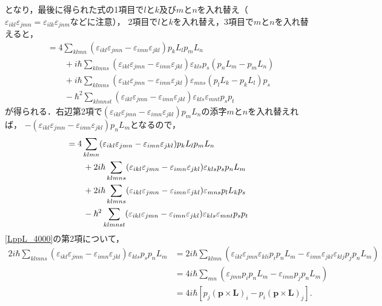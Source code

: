 となり，最後に得られた式の1項目で$l$と$k$及び$m$と$n$を入れ替え（$\varepsilon_{ikl}\varepsilon_{jmn}=\varepsilon_{ilk}\varepsilon_{jnm}$などに注意），
2項目で$l$と$k$を入れ替え，3項目で$m$と$n$を入れ替えると，
\begin{align*}
  [(\boldsymbol{L}\times\boldsymbol{p} - \boldsymbol{p}\times\boldsymbol{L})_i,(\boldsymbol{L}\times\boldsymbol{p} - \boldsymbol{p}\times\boldsymbol{L})_j]
  & = 4\sum_{klmn}(\varepsilon_{ikl}\varepsilon_{jmn} - \varepsilon_{imn}\varepsilon_{jkl})p_kL_lp_mL_n\\
  & \qquad  + i\hbar\sum_{klmns}(\varepsilon_{ikl}\varepsilon_{jmn} - \varepsilon_{imn}\varepsilon_{jkl})\varepsilon_{kls}p_s(p_nL_m - p_mL_n)\\
  & \qquad  + i\hbar\sum_{klmns}(\varepsilon_{ikl}\varepsilon_{jmn} - \varepsilon_{imn}\varepsilon_{jkl})\varepsilon_{mns}(p_lL_k - p_kL_l)p_s\\
  & \qquad - \hbar^2\sum_{klmnst}(\varepsilon_{ikl}\varepsilon_{jmn} - \varepsilon_{imn}\varepsilon_{jkl})\varepsilon_{kls}\varepsilon_{mnt}p_sp_t
\end{align*}
が得られる．右辺第2項で$(\varepsilon_{ikl}\varepsilon_{jmn} - \varepsilon_{imn}\varepsilon_{jkl})p_mL_n$の添字$m$と$n$を入れ替えれば，
$ - (\varepsilon_{ikl}\varepsilon_{jmn} - \varepsilon_{imn}\varepsilon_{jkl})p_nL_m$となるので，
\begin{align}
  [(\boldsymbol{L}\times\boldsymbol{p} - \boldsymbol{p}\times\boldsymbol{L})_i,(\boldsymbol{L}\times\boldsymbol{p} - \boldsymbol{p}\times\boldsymbol{L})_j]
  & = 4\sum_{klmn}(\varepsilon_{ikl}\varepsilon_{jmn} - \varepsilon_{imn}\varepsilon_{jkl})p_kL_lp_mL_n\notag\\
  & \qquad  + 2i\hbar\sum_{klmns}(\varepsilon_{ikl}\varepsilon_{jmn} - \varepsilon_{imn}\varepsilon_{jkl})\varepsilon_{kls}p_sp_nL_m\notag\\
  & \qquad  + 2i\hbar\sum_{klmns}(\varepsilon_{ikl}\varepsilon_{jmn} - \varepsilon_{imn}\varepsilon_{jkl})\varepsilon_{mns}p_lL_kp_s\notag\\
  & \qquad - \hbar^2\sum_{klmnst}(\varepsilon_{ikl}\varepsilon_{jmn} - \varepsilon_{imn}\varepsilon_{jkl})\varepsilon_{kls}\varepsilon_{mnt}p_sp_t\label{LppL_4000}\\
\end{align}
\eqref{LppL_4000}の第2項について，
\begin{align*}
  2i\hbar\sum_{klmns}(\varepsilon_{ikl}\varepsilon_{jmn} - \varepsilon_{imn}\varepsilon_{jkl})\varepsilon_{kls}p_sp_nL_m
  & = 2i\hbar\sum_{klmn}(\varepsilon_{ikl}\varepsilon_{jmn}\varepsilon_{kli}p_ip_nL_m - \varepsilon_{imn}\varepsilon_{jkl}\varepsilon_{klj}p_jp_nL_m)\\
  & = 4i\hbar\sum_{mn}(\varepsilon_{jmn}p_ip_nL_m - \varepsilon_{imn}p_jp_nL_m)\\
  & = 4i\hbar[p_j(\boldsymbol{p}\times\boldsymbol{L})_i - p_i(\boldsymbol{p}\times\boldsymbol{L})_j].
\end{align*}
